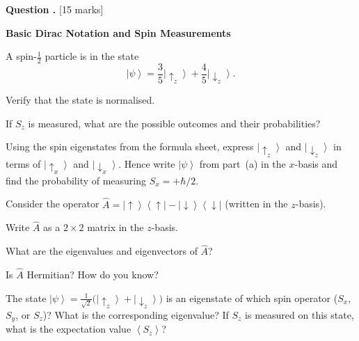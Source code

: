 \documentclass[12pt,a4paper]{article}
\newcounter{questioncounter}
\newcommand{\question}[1]{%
  \stepcounter{questioncounter}%
  \vspace{0.5cm}%
  \noindent\textbf{Question \thequestioncounter.} \hfill [#1 marks]%
  \vspace{0.2cm}%
  \par%
}
\renewcommand{\ket}[1]{\left|#1\right\rangle}
\renewcommand{\ketbra}[2]{\left|#1\right\rangle\!\left\langle #2\right|}
\renewcommand{\expect}[1]{\left\langle #1\right\rangle}
\begin{document}
\newpage

\question{15}

\noindent\textbf{Basic Dirac Notation and Spin Measurements}

\begin{parts}
\item A spin-$\frac{1}{2}$ particle is in the state
\[
\ket{\psi} = \frac{3}{5}\ket{\!\uparrow_z} + \frac{4}{5}\ket{\!\downarrow_z}.
\]
\begin{parts}
\item Verify that the state is normalised. 
\item If $S_z$ is measured, what are the possible outcomes and their probabilities? 
\end{parts}

\item Using the spin eigenstates from the formula sheet, express $\ket{\!\uparrow_z}$ and $\ket{\!\downarrow_z}$ in terms of $\ket{\!\uparrow_x}$ and $\ket{\!\downarrow_x}$. Hence write $\ket{\psi}$ from part~(a) in the $x$-basis and find the probability of measuring $S_x = +\hbar/2$. 

\item Consider the operator $\hat{A} = \ketbra{\!\uparrow}{\uparrow\!} - \ketbra{\!\downarrow}{\downarrow\!}$ (written in the $z$-basis).
\begin{parts}
\item Write $\hat{A}$ as a $2\times 2$ matrix in the $z$-basis. 
\item What are the eigenvalues and eigenvectors of $\hat{A}$? 
\item Is $\hat{A}$ Hermitian? How do you know? 
\end{parts}

\item The state $\ket{\psi} = \frac{1}{\sqrt{2}}\bigl(\ket{\!\uparrow_z} + \ket{\!\downarrow_z}\bigr)$ is an eigenstate of which spin operator ($S_x$, $S_y$, or $S_z$)? What is the corresponding eigenvalue? If $S_z$ is measured on this state, what is the expectation value $\expect{S_z}$? 
\end{parts}

\newpage


\end{document}
